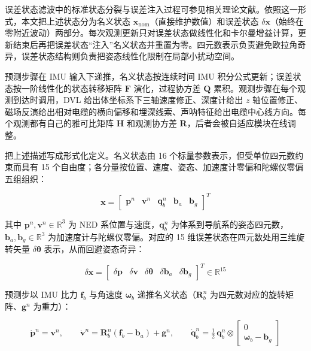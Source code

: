 误差状态滤波中的标准状态分裂与误差注入过程可参见相关理论文献\cite{sola2017quaternion}。依照这一形式，本文把上述状态分为名义状态 \(\boldsymbol{x}_{\mathrm{nom}}\)（直接维护数值）和误差状态 \(\delta\boldsymbol{x}\)（始终在零附近波动）两部分。每次观测更新只对误差状态做线性化和卡尔曼增益计算，更新结束后再把误差状态``注入''名义状态并重置为零。四元数表示负责避免欧拉角奇异，误差状态结构则负责把姿态线性化限制在局部小扰动空间。

预测步骤在 IMU 输入下递推，名义状态按连续时间 IMU 积分公式更新；误差状态按一阶线性化的状态转移矩阵 \(\boldsymbol{F}\) 演化，过程协方差 \(\boldsymbol{Q}\) 累积。观测步骤在每个观测到达时调用，DVL 给出体坐标系下三轴速度修正、深度计给出 \(z\) 轴位置修正、磁场反演给出相对电缆的横向偏移和埋深线索、声呐特征给出电缆中心线方向。每个观测都有自己的雅可比矩阵 \(\boldsymbol{H}\) 和观测协方差 \(\boldsymbol{R}\)，后者会被自适应模块在线调整。

把上述描述写成形式化定义。名义状态由 16 个标量参数表示，但受单位四元数约束而具有 15 个自由度；各分量按位置、速度、姿态、加速度计零偏和陀螺仪零偏五组组织：

\begin{equation}
\boldsymbol{x} = \begin{bmatrix} \boldsymbol{p}^n & \boldsymbol{v}^n & \boldsymbol{q}_b^n & \boldsymbol{b}_a & \boldsymbol{b}_g \end{bmatrix}^T
\label{eq:ch03-nominal-state}
\end{equation}

其中 \(\boldsymbol{p}^n, \boldsymbol{v}^n \in \mathbb{R}^3\) 为 NED 系位置与速度，\(\boldsymbol{q}_b^n\) 为体系到导航系的姿态四元数，\(\boldsymbol{b}_a, \boldsymbol{b}_g \in \mathbb{R}^3\) 为加速度计与陀螺仪零偏。对应的 15 维误差状态在四元数处用三维旋转矢量 \(\delta\boldsymbol{\theta}\) 表示，从而回避姿态奇异：

\begin{equation}
\delta\boldsymbol{x} = \begin{bmatrix} \delta\boldsymbol{p} & \delta\boldsymbol{v} & \delta\boldsymbol{\theta} & \delta\boldsymbol{b}_a & \delta\boldsymbol{b}_g \end{bmatrix}^T \in \mathbb{R}^{15}
\label{eq:ch03-error-state}
\end{equation}

预测步以 IMU 比力 \(\boldsymbol{f}_b\) 与角速度 \(\boldsymbol{\omega}_b\) 递推名义状态（\(\boldsymbol{R}_b^n\) 为四元数对应的旋转矩阵、\(\boldsymbol{g}^n\) 为重力）：

\begin{equation}
\dot{\boldsymbol{p}}^n = \boldsymbol{v}^n, \qquad \dot{\boldsymbol{v}}^n = \boldsymbol{R}_b^n(\boldsymbol{f}_b - \boldsymbol{b}_a) + \boldsymbol{g}^n, \qquad \dot{\boldsymbol{q}}_b^n = \tfrac{1}{2}\,\boldsymbol{q}_b^n \otimes \begin{bmatrix} 0 \\ \boldsymbol{\omega}_b - \boldsymbol{b}_g \end{bmatrix}
\label{eq:ch03-nominal-propagation}
\end{equation}

